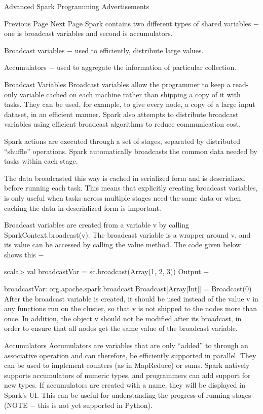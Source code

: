 Advanced Spark Programming
Advertisements

 
 Previous Page Next Page  
Spark contains two different types of shared variables − one is broadcast variables and second is accumulators.

Broadcast variables − used to efficiently, distribute large values.

Accumulators − used to aggregate the information of particular collection.

Broadcast Variables
Broadcast variables allow the programmer to keep a read-only variable cached on each machine rather than shipping a copy of it with tasks. They can be used, for example, to give every node, a copy of a large input dataset, in an efficient manner. Spark also attempts to distribute broadcast variables using efficient broadcast algorithms to reduce communication cost.

Spark actions are executed through a set of stages, separated by distributed “shuffle” operations. Spark automatically broadcasts the common data needed by tasks within each stage.

The data broadcasted this way is cached in serialized form and is deserialized before running each task. This means that explicitly creating broadcast variables, is only useful when tasks across multiple stages need the same data or when caching the data in deserialized form is important.

Broadcast variables are created from a variable v by calling SparkContext.broadcast(v). The broadcast variable is a wrapper around v, and its value can be accessed by calling the value method. The code given below shows this −

scala> val broadcastVar = sc.broadcast(Array(1, 2, 3))
Output −

broadcastVar: org.apache.spark.broadcast.Broadcast[Array[Int]] = Broadcast(0)
After the broadcast variable is created, it should be used instead of the value v in any functions run on the cluster, so that v is not shipped to the nodes more than once. In addition, the object v should not be modified after its broadcast, in order to ensure that all nodes get the same value of the broadcast variable.

Accumulators
Accumulators are variables that are only “added” to through an associative operation and can therefore, be efficiently supported in parallel. They can be used to implement counters (as in MapReduce) or sums. Spark natively supports accumulators of numeric types, and programmers can add support for new types. If accumulators are created with a name, they will be displayed in Spark’s UI. This can be useful for understanding the progress of running stages (NOTE − this is not yet supported in Python).

